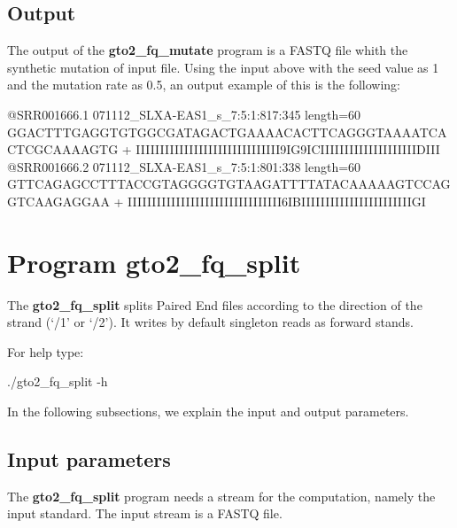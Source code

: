 \documentclass[11pt,]{krantz}
\newenvironment{Shaded}{\begin{snugshade}}{\end{snugshade}}
\newcommand{\ExtensionTok}[1]{#1}
\newcommand{\NormalTok}[1]{#1}
\begin{document}
\subsection*{Output}\label{output-10}


The output of the \textbf{gto2\_fq\_mutate} program is a FASTQ file
whith the synthetic mutation of input file. Using the input above with
the seed value as 1 and the mutation rate as 0.5, an output example of
this is the following:

\begin{Shaded}
\begin{Highlighting}[]
\ExtensionTok{@SRR001666.1}\NormalTok{ 071112_SLXA-EAS1_s_7:5:1:817:345 length=60}
\ExtensionTok{GGACTTTGAGGTGTGGCGATAGACTGAAAACACTTCAGGGTAAAATCACTCGCAAAAGTG}
\ExtensionTok{+}
\ExtensionTok{IIIIIIIIIIIIIIIIIIIIIIIIIIIIII9IG9ICIIIIIIIIIIIIIIIIIIIIDIII}
\ExtensionTok{@SRR001666.2}\NormalTok{ 071112_SLXA-EAS1_s_7:5:1:801:338 length=60}
\ExtensionTok{GTTCAGAGCCTTTACCGTAGGGGTGTAAGATTTTATACAAAAAGTCCAGGTCAAGAGGAA}
\ExtensionTok{+}
\ExtensionTok{IIIIIIIIIIIIIIIIIIIIIIIIIIIIIIII6IBIIIIIIIIIIIIIIIIIIIIIIIGI}
\end{Highlighting}
\end{Shaded}

\section{Program gto2\_fq\_split}\label{program-gto2_fq_split}

The \textbf{gto2\_fq\_split} splits Paired End files according to the
direction of the strand (`/1' or `/2'). It writes by default singleton
reads as forward stands.

For help type:

\begin{Shaded}
\begin{Highlighting}[]
\ExtensionTok{./gto2_fq_split}\NormalTok{ -h}
\end{Highlighting}
\end{Shaded}

In the following subsections, we explain the input and output
parameters.

\subsection*{Input parameters}\label{input-parameters-11}


The \textbf{gto2\_fq\_split} program needs a stream for the computation,
namely the input standard. The input stream is a FASTQ file.
\end{document}
